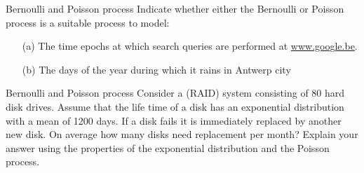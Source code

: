 \begin{problem}{Bernoulli and Poisson process}
Indicate whether either the Bernoulli or Poisson process is a suitable process to model:
\begin{itemize}
    \item[(a)] The time epochs at which search queries are performed at \url{www.google.be}.
\item[(b)] The days of the year during which it rains in Antwerp city
\end{itemize}
\end{problem}

\begin{problem}{Bernoulli and Poisson process}
Consider a (RAID) system consisting of 80 hard
disk drives. Assume that the life time of a disk has an exponential distribution with a
mean of 1200 days. If a disk fails it is immediately replaced by another new disk. On
average how many disks need replacement per month? Explain your answer using the
properties of the exponential distribution and the Poisson process.
\end{problem}
